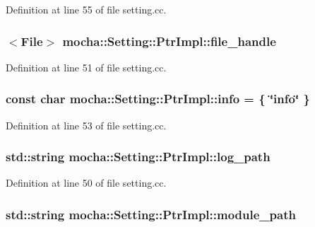 Definition at line 55 of file setting.cc.

\hypertarget{classmocha_1_1_setting_1_1_ptr_impl_adaa2a9b5f450b5860a9eeae593a09d26}{
\subsubsection[{file\_\-handle}]{$<${\bf File}$>$ {\bf mocha::Setting::PtrImpl::file\_\-handle}}}
\label{classmocha_1_1_setting_1_1_ptr_impl_adaa2a9b5f450b5860a9eeae593a09d26}


Definition at line 51 of file setting.cc.

\hypertarget{classmocha_1_1_setting_1_1_ptr_impl_ac552226d2066caf42767a46cd55374e1}{
\subsubsection[{info}]{\setlength{\rightskip}{0pt plus 5cm}const char {\bf mocha::Setting::PtrImpl::info} = \{ \char`\"{}info\char`\"{} \}}}
\label{classmocha_1_1_setting_1_1_ptr_impl_ac552226d2066caf42767a46cd55374e1}


Definition at line 53 of file setting.cc.

\hypertarget{classmocha_1_1_setting_1_1_ptr_impl_a3c6deed4732e06e7e8e9e79e5a04b3ed}{
\subsubsection[{log\_\-path}]{\setlength{\rightskip}{0pt plus 5cm}std::string {\bf mocha::Setting::PtrImpl::log\_\-path}}}
\label{classmocha_1_1_setting_1_1_ptr_impl_a3c6deed4732e06e7e8e9e79e5a04b3ed}


Definition at line 50 of file setting.cc.

\hypertarget{classmocha_1_1_setting_1_1_ptr_impl_afdf93bd92b091ae41c99a3893f53556b}{
\subsubsection[{module\_\-path}]{\setlength{\rightskip}{0pt plus 5cm}std::string {\bf mocha::Setting::PtrImpl::module\_\-path}}}
\label{classmocha_1_1_setting_1_1_ptr_impl_afdf93bd92b091ae41c99a3893f53556b}


